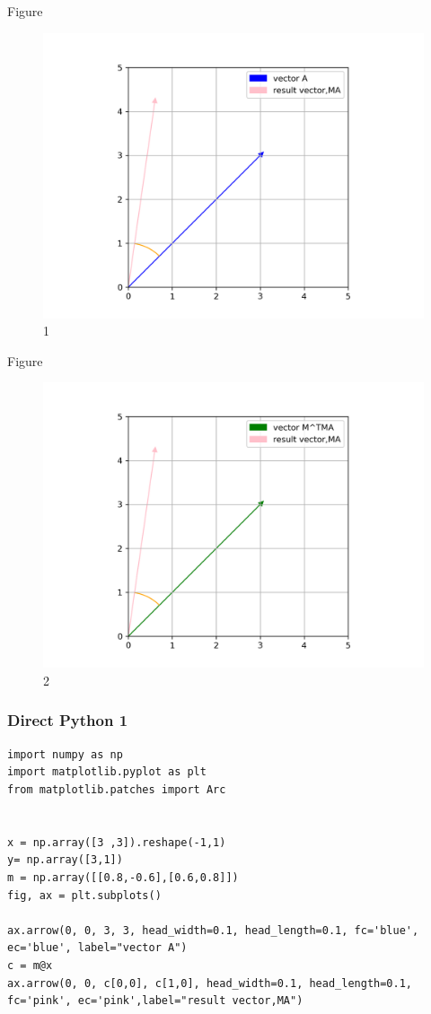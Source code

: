 \documentclass{beamer}
\begin{document}
\begin{frame}{Figure}
    \begin{figure}[H]
    \centering
    \includegraphics[width=0.7\columnwidth]{figs/fig1.png}
    \caption{1}
    \label{fig:placeholder}
\end{figure}
\end{frame}
\begin{frame}{Figure}
\begin{figure}[H]
    \centering
    \includegraphics[width=0.7\columnwidth]{figs/fig2.png}
    \caption{2}
    \label{fig:placeholder}
\end{figure}
\end{frame}
\begin{frame}[fragile]
\frametitle{Direct Python 1}
\begin{lstlisting}
import numpy as np
import matplotlib.pyplot as plt
from matplotlib.patches import Arc


x = np.array([3 ,3]).reshape(-1,1)
y= np.array([3,1])
m = np.array([[0.8,-0.6],[0.6,0.8]])
fig, ax = plt.subplots()

ax.arrow(0, 0, 3, 3, head_width=0.1, head_length=0.1, fc='blue', ec='blue', label="vector A")
c = m@x
ax.arrow(0, 0, c[0,0], c[1,0], head_width=0.1, head_length=0.1, fc='pink', ec='pink',label="result vector,MA")
\end{lstlisting}
\end{frame}
\end{document}
